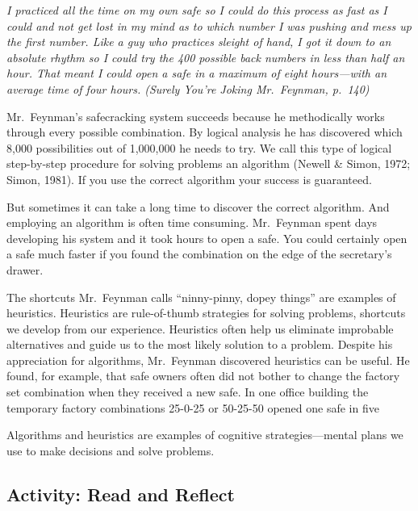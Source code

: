\documentclass[
]{book}
\begin{document}
\emph{I practiced all the time on my own safe so I could do this process as fast as I could and not get lost in my mind as to which number I was pushing and mess up the first number. Like a guy who practices sleight of hand, I got it down to an absolute rhythm so I could try the 400 possible back numbers in less than half an hour. That meant I could open a safe in a maximum of eight hours---with an average time of four hours. (Surely You're Joking Mr.~Feynman, p.~140)}

Mr.~Feynman's safecracking system succeeds because he methodically works through every possible combination. By logical analysis he has discovered which 8,000 possibilities out of 1,000,000 he needs to try. We call this type of logical step-by-step procedure for solving problems an algorithm (Newell \& Simon, 1972; Simon, 1981). If you use the correct algorithm your success is guaranteed.

But sometimes it can take a long time to discover the correct algorithm. And employing an algorithm is often time consuming. Mr.~Feynman spent days developing his system and it took hours to open a safe. You could certainly open a safe much faster if you found the combination on the edge of the secretary's drawer.

The shortcuts Mr.~Feynman calls ``ninny-pinny, dopey things'' are examples of heuristics. Heuristics are rule-of-thumb strategies for solving problems, shortcuts we develop from our experience. Heuristics often help us eliminate improbable alternatives and guide us to the most likely solution to a problem. Despite his appreciation for algorithms, Mr.~Feynman discovered heuristics can be useful. He found, for example, that safe owners often did not bother to change the factory set combination when they received a new safe. In one office building the temporary factory combinations 25-0-25 or 50-25-50 opened one safe in five

Algorithms and heuristics are examples of cognitive strategies---mental plans we use to make decisions and solve problems.

\hypertarget{activity-read-and-reflect}{%
\subsection*{Activity: Read and Reflect}\label{activity-read-and-reflect}}
\end{document}
